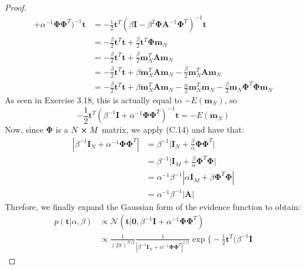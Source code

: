 \begin{proof}
\begin{align*}
            + \alpha^{-1}\mathbf{\Phi}\mathbf{\Phi}^T)^{-1}\mathbf{t}
        &= -\frac{1}{2}\mathbf{t}^T (\beta\mathbf{I} 
            - \beta^2\mathbf{\Phi}\mathbf{A}^{-1}\mathbf{\Phi}^T)^{-1}\mathbf{t} \\
        &= -\frac{\beta}{2} \mathbf{t}^T\mathbf{t} 
            + \frac{\beta}{2} \mathbf{t}^T\mathbf{\Phi}\mathbf{m}_N \\
        &= -\frac{\beta}{2} \mathbf{t}^T\mathbf{t} 
            + \frac{\beta}{2} \mathbf{m}_N^T\mathbf{A}\mathbf{m}_N \\
        &= -\frac{\beta}{2} \mathbf{t}^T\mathbf{t} + \beta \mathbf{m}_N^T\mathbf{A}\mathbf{m}_N 
            - \frac{\beta}{2}\mathbf{m}_N^T\mathbf{A}\mathbf{m}_N \\
        &= -\frac{\beta}{2} \mathbf{t}^T\mathbf{t} + \beta \mathbf{m}_N^T\mathbf{A}\mathbf{m}_N 
            - \frac{\alpha}{2}\mathbf{m}_N^T\mathbf{m}_N 
            - \frac{\beta}{2} \mathbf{m}_N\mathbf{\Phi}^T\mathbf{\Phi}\mathbf{m}_N
    \end{align*}
    As seen in Exercise 3.18, this is actually equal to $-E(\mathbf{m}_N)$, so
    \[
        -\frac{1}{2}\mathbf{t}^T(\beta^{-1}\mathbf{I} 
            + \alpha^{-1}\mathbf{\Phi}\mathbf{\Phi}^T)^{-1}\mathbf{t}
        = -E(\mathbf{m}_N)
    \] 
    Now, since $\mathbf{\Phi}$ is a $N \cross M$ matrix, we apply (C.14) and have that:
    \begin{align*}
        |\beta^{-1}\mathbf{I}_N + \alpha^{-1}\mathbf{\Phi}\mathbf{\Phi}^T|
        &= \beta^{-1} \bigg|\mathbf{I}_N + \frac{\beta}{\alpha} 
            \mathbf{\Phi}\mathbf{\Phi}^T\bigg| \\
        &= \beta^{-1} \bigg|\mathbf{I}_M 
            + \frac{\beta}{\alpha}\mathbf{\Phi}^T\mathbf{\Phi}\bigg| \\
        &= \alpha^{-1}\beta^{-1}|\alpha\mathbf{I}_M + \beta\mathbf{\Phi}^T\mathbf{\Phi}| \\
        &= \alpha^{-1}\beta^{-1}|\mathbf{A}|
    \end{align*}
    Threfore, we finally expand the Gaussian form of the evidence function to obtain:
    \begin{align*}
        p(\mathbf{t} | \alpha, \beta) 
        &\propto \mathcal{N}(\mathbf{t} | \mathbf{0}, \beta^{-1}\mathbf{I} 
            + \alpha^{-1}\mathbf{\Phi}\mathbf{\Phi}^T) \\
        &\propto \frac{1}{(2\pi)^{N/2}} 
            \frac{1}{|\beta^{-1}\mathbf{I}_N + \alpha^{-1}\mathbf{\Phi}\mathbf{\Phi}^T|^{1/2}}
            \exp\bigg\{-\frac{1}{2}\mathbf{t}^T(\beta^{-1}\mathbf{I} 

\end{align*}
\end{proof}
